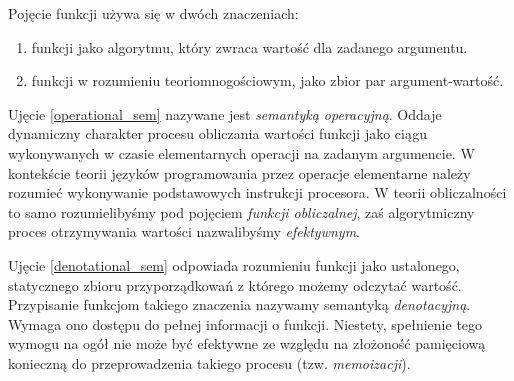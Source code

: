 Pojęcie funkcji używa się w dwóch znaczeniach:
\begin{enumerate}[label=(\alph*)]
\item funkcji jako algorytmu, który zwraca wartość dla zadanego argumentu.\label{operational_sem}
\item funkcji w rozumieniu teoriomnogościowym, jako zbior par argument-wartość.
\label{denotational_sem}
\end{enumerate}

Ujęcie \ref{operational_sem} nazywane jest \emph{semantyką operacyjną}. Oddaje dynamiczny charakter procesu obliczania wartości funkcji jako ciągu wykonywanych w czasie elementarnych operacji na zadanym argumencie. W kontekście teorii języków programowania przez operacje elementarne należy rozumieć wykonywanie podstawowych instrukcji procesora. W teorii obliczalności to samo rozumielibyśmy pod pojęciem \emph{funkcji obliczalnej}, zaś algorytmiczny proces otrzymywania wartości nazwalibyśmy \emph{efektywnym}.

Ujęcie \ref{denotational_sem} odpowiada rozumieniu funkcji jako ustalonego, statycznego zbioru przyporządkowań z którego możemy odczytać wartość. Przypisanie funkcjom takiego znaczenia nazywamy semantyką \emph{denotacyjną}. Wymaga ono dostępu do pełnej informacji o funkcji. Niestety, spełnienie tego wymogu na ogół nie może być efektywne ze względu na złożoność pamięciową konieczną do przeprowadzenia takiego procesu (tzw. \emph{memoizacji}).

